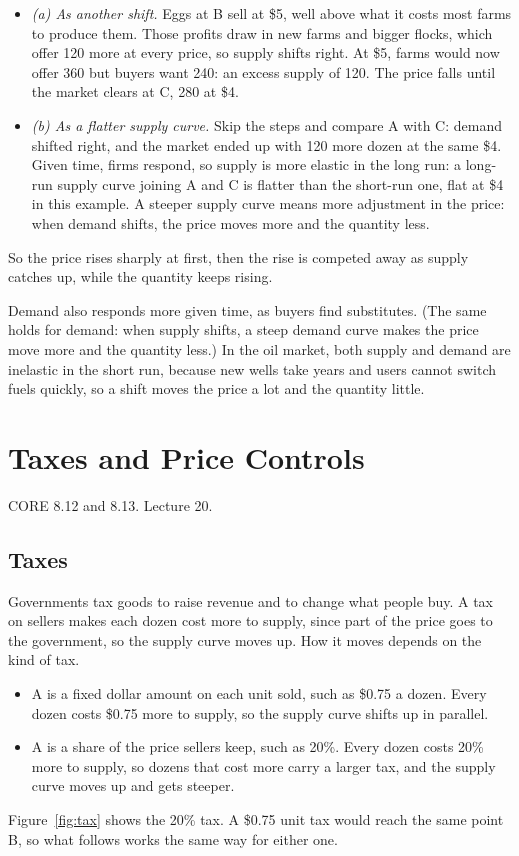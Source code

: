 \documentclass[11pt]{article}
\newcommand{\secinfo}[1]{{\small\color{muted}#1\par}\vspace{2pt}}
\begin{document}
\begin{itemize}
\item \emph{(a) As another shift.} Eggs at B sell at \$5, well above what it costs most farms to produce them. Those profits draw in new farms and bigger flocks, which offer 120 more at every price, so supply shifts right. At \$5, farms would now offer 360 but buyers want 240: an excess supply of 120. The price falls until the market clears at C, 280 at \$4.
\item \emph{(b) As a flatter supply curve.} Skip the steps and compare A with C: demand shifted right, and the market ended up with 120 more dozen at the same \$4. Given time, firms respond, so supply is more elastic in the long run: a long-run supply curve joining A and C is flatter than the short-run one, flat at \$4 in this example. A steeper supply curve means more adjustment in the price: when demand shifts, the price moves more and the quantity less.
\end{itemize}
So the price rises sharply at first, then the rise is competed away as supply catches up, while the quantity keeps rising.

Demand also responds more given time, as buyers find substitutes. (The same holds for demand: when supply shifts, a steep demand curve makes the price move more and the quantity less.) In the oil market, both supply and demand are inelastic in the short run, because new wells take years and users cannot switch fuels quickly, so a shift moves the price a lot and the quantity little.

\section{Taxes and Price Controls}
\secinfo{CORE 8.12 and 8.13. Lecture 20.}

\subsection{Taxes}

Governments tax goods to raise revenue and to change what people buy. A tax on sellers makes each dozen cost more to supply, since part of the price goes to the government, so the supply curve moves up. How it moves depends on the kind of tax.
\begin{itemize}
\item A  is a fixed dollar amount on each unit sold, such as \$0.75 a dozen. Every dozen costs \$0.75 more to supply, so the supply curve shifts up in parallel.
\item A  is a share of the price sellers keep, such as 20\%. Every dozen costs 20\% more to supply, so dozens that cost more carry a larger tax, and the supply curve moves up and gets steeper.
\end{itemize}
Figure~\ref{fig:tax} shows the 20\% tax. A \$0.75 unit tax would reach the same point B, so what follows works the same way for either one.
\end{document}
